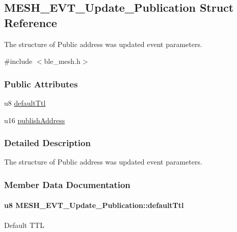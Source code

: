 \hypertarget{struct_m_e_s_h___e_v_t___update___publication}{}\subsection{M\+E\+S\+H\+\_\+\+E\+V\+T\+\_\+\+Update\+\_\+\+Publication Struct Reference}
\label{struct_m_e_s_h___e_v_t___update___publication}


The structure of Public address was updated event parameters.  




{\ttfamily \#include $<$ble\+\_\+mesh.\+h$>$}

\subsubsection*{Public Attributes}
\begin{DoxyCompactItemize}
\item 
u8 \hyperlink{struct_m_e_s_h___e_v_t___update___publication_ad5ce81f3615e1cff7467b553ebf33ef7}{default\+Ttl}
\item 
u16 \hyperlink{struct_m_e_s_h___e_v_t___update___publication_a338e8b4e91e4551b22bd8df5f57355bd}{publish\+Address}
\end{DoxyCompactItemize}


\subsubsection{Detailed Description}
The structure of Public address was updated event parameters. 

\subsubsection{Member Data Documentation}
\paragraph[{\texorpdfstring{default\+Ttl}{defaultTtl}}]{\setlength{\rightskip}{0pt plus 5cm}u8 M\+E\+S\+H\+\_\+\+E\+V\+T\+\_\+\+Update\+\_\+\+Publication\+::default\+Ttl}\hypertarget{struct_m_e_s_h___e_v_t___update___publication_ad5ce81f3615e1cff7467b553ebf33ef7}{}\label{struct_m_e_s_h___e_v_t___update___publication_ad5ce81f3615e1cff7467b553ebf33ef7}
Default T\+TL 
